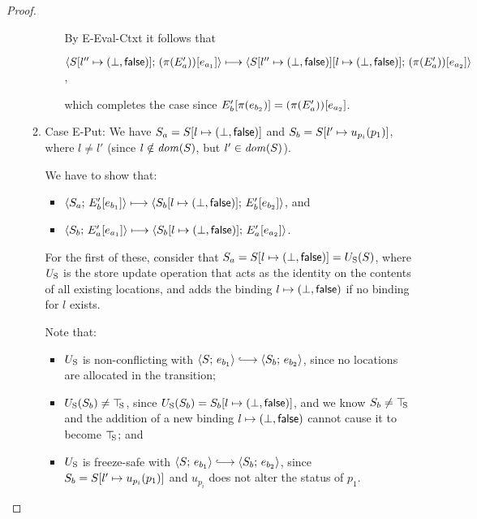 \begin{proof}
\begin{enumerate}
\begin{enumerate}
\begin{itemize}
        By {\sc E-Eval-Ctxt} it follows that
        
        $\langle S[l'' \mapsto (\bot, \textsf{false})];\, (\pi(E'_a))\hspace{-0.5mm}\left[e_{a_1}\right] \rangle
        \longmapsto \\
        \langle S[l'' \mapsto (\bot, \textsf{false})][l \mapsto (\bot, \textsf{false})];\, (\pi(E'_a))\hspace{-0.5mm}\left[e_{a_2}\right] \rangle$,

        which completes the case since $E'_b\hspace{-0.5mm}\left[\pi(e_{b_2})\right]
        = (\pi(E'_a))\hspace{-0.5mm}\left[e_{a_2}\right]$.


      \end{itemize}

    \item \label{slqc-new-put}Case {\sc E-Put}: We have $S_a =
      S[l \mapsto (\bot, \textsf{false})]$ and $S_b =
      S[l' \mapsto u_{p_i}(p_1)]$, where $l \neq l'$ (since $l
      \notin \mathit{dom}(S)$, but $l' \in \mathit{dom}(S)$).

      We have to show that:
      \begin{itemize}
      \item $\langle S_a;\, E'_b\hspace{-0.5mm}\left[e_{b_1}\right] \rangle \longmapsto
        \langle S_b[l \mapsto (\bot, \textsf{false})];\, E'_b\hspace{-0.5mm}\left[e_{b_2}\right] \rangle$,
        and
      \item $\langle S_b;\, E'_a\hspace{-0.5mm}\left[e_{a_1}\right] \rangle \longmapsto
        \langle S_b[l \mapsto (\bot, \textsf{false})];\, E'_a\hspace{-0.5mm}\left[e_{a_2}\right] \rangle$.
      \end{itemize}

      For the first of these, consider that $S_a =
      S[l \mapsto (\bot, \textsf{false})] = U_{\mathrm{S}}(S)$, where $U_{\mathrm{S}}$ is the
      store update operation that acts as the identity on the contents
      of all existing locations, and adds the binding
      $l \mapsto (\bot, \textsf{false})$ if no binding for $l$
      exists.

      Note that:
      \begin{itemize}
      \item $U_{\mathrm{S}}$ is non-conflicting with $\config{S}{e_{b_1}}
        \parstepsto \config{S_b}{e_{b_2}}$, since no locations are
        allocated in the transition;
      \item $U_{\mathrm{S}}(S_b) \neq \top\hspace{-0.85mm}_{\mathrm{S}}$, since $U_{\mathrm{S}}(S_b) =
        S_b[l \mapsto (\bot, \textsf{false})]$, and we know $S_b \neq
        \top\hspace{-0.85mm}_{\mathrm{S}}$ and the addition of a new binding
        $l \mapsto (\bot, \textsf{false})$ cannot cause it to
        become $\top\hspace{-0.85mm}_{\mathrm{S}}$; and
      \item $U_{\mathrm{S}}$ is freeze-safe with $\config{S}{e_{b_1}} \parstepsto
        \config{S_b}{e_{b_2}}$, since $S_b =
        S[l' \mapsto u_{p_i}(p_1)]$ and $u_{p_i}$ does not alter
        the status of $p_1$.


\end{itemize}
\end{enumerate}
\end{enumerate}
\end{proof}
